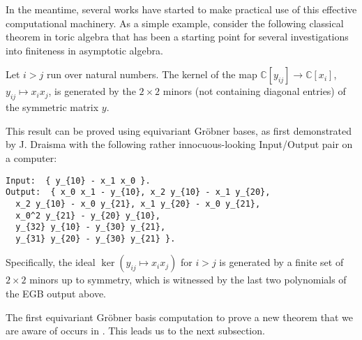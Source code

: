 In the meantime, several works have started to make practical use of this effective computational machinery.  As a simple example, consider 
the following classical theorem in toric algebra that has been a starting point for several investigations into finiteness in asymptotic algebra.

\begin{theorem}\label{toric2x2}
Let $i > j$ run over natural numbers.  The kernel of the map $\mathbb C[y_{ij}] \to \mathbb C[x_i]$, $y_{ij} \mapsto x_i x_j$, is generated by the $2 \times 2$ minors (not containing diagonal entries) of the symmetric matrix $y$.
\end{theorem}

This result can be proved using equivariant Gr\"obner bases, as first demonstrated by J. Draisma with the following rather innocuous-looking Input/Output pair on a computer:
\begin{verbatim}
Input:  { y_{10} - x_1 x_0 }.
Output:  { x_0 x_1 - y_{10}, x_2 y_{10} - x_1 y_{20},
  x_2 y_{10} - x_0 y_{21}, x_1 y_{20} - x_0 y_{21},
  x_0^2 y_{21} - y_{20} y_{10},
  y_{32} y_{10} - y_{30} y_{21},  
  y_{31} y_{20} - y_{30} y_{21} }.
\end{verbatim}
Specifically, the ideal $\ker{(y_{ij} \mapsto x_i x_j)}$ for $i > j$ is generated by a finite set of $2 \times 2$ minors up to symmetry, 
which is witnessed by the last two polynomials of the EGB output above.

The first equivariant Gr\"obner basis computation to prove a new theorem that we are aware of occurs in \cite{Brouwer09e}. This leads us to the next subsection. 
